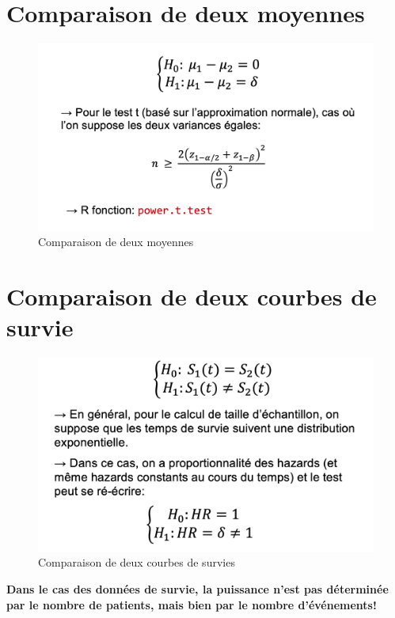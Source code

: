 \section{Comparaison de deux moyennes}
\begin{figure}[H]
    \centering
    \includegraphics[scale =0.5]{images/comparaison2moyennes.png}
    \caption{Comparaison de deux moyennes}
    \label{fig:comp2moyennes}
\end{figure}
\section{Comparaison de deux courbes de survie}
\begin{figure}[H]
    \centering
    \includegraphics[scale=0.5]{images/comparasion2courbes.png}
    \caption{Comparaison de deux courbes de survies}
    \label{fig:survie}
\end{figure}

\textbf{Dans le cas des données de survie, la puissance n’est pas déterminée par le nombre de patients, mais bien par le nombre d’événements!}
